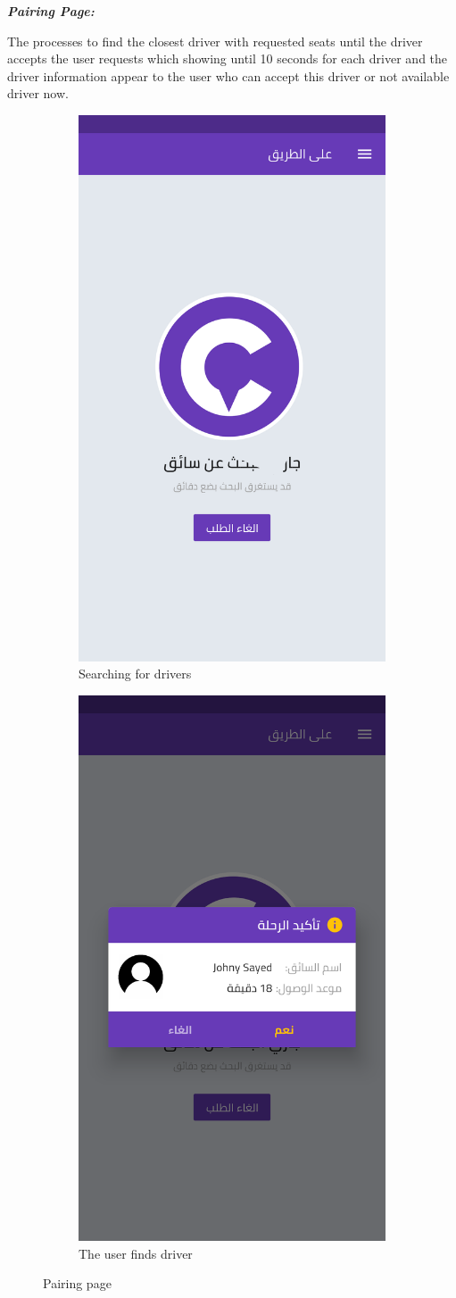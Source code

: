 \par \textbf{\textit{Pairing Page:}}
\par  The processes to find the closest driver with requested seats until the driver accepts the user requests which showing until 10 seconds for each driver and the driver information appear to the user  who can accept this driver or not available driver now.
\begin{figure}[H] 
  \begin{subfigure}[b]{0.5\linewidth}
    \centering
    \includegraphics[width=0.5\linewidth]{images/ch3/5.png}
    \caption{Searching for drivers} 
    \label{fig7:a} 
  \end{subfigure}%
  \begin{subfigure}[b]{0.5\linewidth}
    \centering
    \includegraphics[width=0.5\linewidth]{images/ch3/6.png} 
    \caption{The user finds driver} 
    \label{fig7:d} 
  \end{subfigure} 
  \caption{ Pairing page}
  \label{fig7} 
\end{figure}

